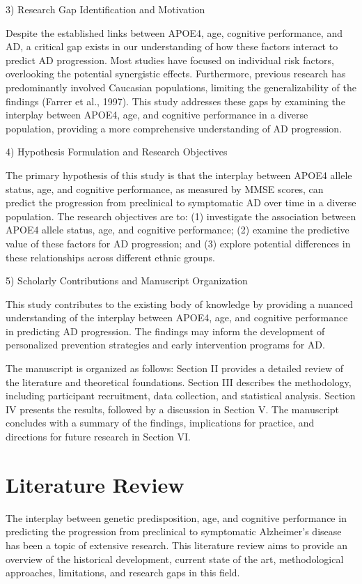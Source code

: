 \documentclass[conference]{IEEEtran}
\begin{document}
3) Research Gap Identification and Motivation

Despite the established links between APOE4, age, cognitive performance, and AD, a critical gap exists in our understanding of how these factors interact to predict AD progression. Most studies have focused on individual risk factors, overlooking the potential synergistic effects. Furthermore, previous research has predominantly involved Caucasian populations, limiting the generalizability of the findings (Farrer et al., 1997). This study addresses these gaps by examining the interplay between APOE4, age, and cognitive performance in a diverse population, providing a more comprehensive understanding of AD progression.

4) Hypothesis Formulation and Research Objectives

The primary hypothesis of this study is that the interplay between APOE4 allele status, age, and cognitive performance, as measured by MMSE scores, can predict the progression from preclinical to symptomatic AD over time in a diverse population. The research objectives are to: (1) investigate the association between APOE4 allele status, age, and cognitive performance; (2) examine the predictive value of these factors for AD progression; and (3) explore potential differences in these relationships across different ethnic groups.

5) Scholarly Contributions and Manuscript Organization

This study contributes to the existing body of knowledge by providing a nuanced understanding of the interplay between APOE4, age, and cognitive performance in predicting AD progression. The findings may inform the development of personalized prevention strategies and early intervention programs for AD. 

The manuscript is organized as follows: Section II provides a detailed review of the literature and theoretical foundations. Section III describes the methodology, including participant recruitment, data collection, and statistical analysis. Section IV presents the results, followed by a discussion in Section V. The manuscript concludes with a summary of the findings, implications for practice, and directions for future research in Section VI.

\section{Literature Review}
The interplay between genetic predisposition, age, and cognitive performance in predicting the progression from preclinical to symptomatic Alzheimer's disease has been a topic of extensive research. This literature review aims to provide an overview of the historical development, current state of the art, methodological approaches, limitations, and research gaps in this field.
\end{document}
